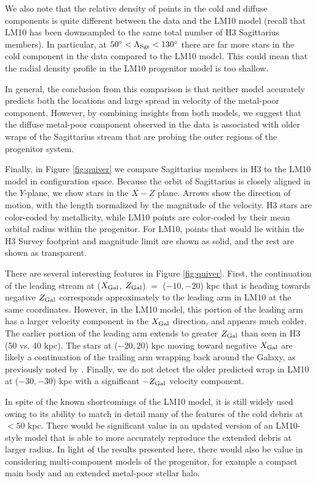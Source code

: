 \documentclass[twocolumn,tighten,twocolappendix]{aastex63}
\newcommand{\sgr}{Sagittarius}
\begin{document}
\begin{CJK*}{UTF8}{gbsn}
We also note that the relative density of points in the cold and diffuse components is quite different between the data and the LM10 model (recall that LM10 has been downsampled to the same total number of H3 \sgr{} members).  In particular, at $50^\circ<\Lambda_{\rm Sgr}<130^\circ$ there are far more stars in the cold component in the data compared to the LM10 model.  This could mean that the radial density profile in the LM10 progenitor model is too shallow.

In general, the conclusion from this comparison is that neither model accurately predicts both the locations and large spread in velocity of the metal-poor component.  However, by combining insights from both models, we suggest that the diffuse metal-poor component observed in the data is associated with older wraps of the \sgr{} stream that are probing the outer regions of the progenitor system.

Finally, in Figure \ref{fig:quiver} we compare \sgr{} members in H3 to the LM10 model in configuration space.  Because the orbit of \sgr{} is closely aligned in the $Y$-plane, we show stars in the $X-Z$ plane.  Arrows show the direction of motion, with the length normalized by the magnitude of the velocity.   H3 stars are color-coded by metallicity, while LM10 points are color-coded by their mean orbital radius within the progenitor.  For LM10, points that would lie within the H3 Survey footprint and magnitude limit are shown as solid, and the rest are shown as transparent.

There are several interesting features in Figure \ref{fig:quiver}.  First, the continuation of the leading stream at ($X_{\rm Gal}$, $Z_{\rm Gal}$) $=$ ($-10,-20$) kpc that is heading towards negative $Z_{\rm Gal}$ corresponds approximately to the leading arm in LM10 at the same coordinates.  However, in the LM10 model, this portion of the leading arm has a larger velocity component in the $X_{\rm Gal}$ direction, and appears much colder.  The earlier portion of the leading arm extends to greater $Z_{\rm Gal}$ than seen in H3 (50 vs. 40 kpc).  The stars at ($-20,20$) kpc moving toward negative $X_{\rm Gal}$ are likely a continuation of the trailing arm wrapping back around the Galaxy, as previously noted by \citet{Yang19}.  Finally, we do not detect the older predicted wrap in LM10 at ($-30,-30$) kpc with a significant $-Z_{\rm Gal}$ velocity component.

In spite of the known shortcomings of the LM10 model, it is still widely used owing to its ability to match in detail many of the features of the cold debris at $<50$ kpc.  There would be significant value in an updated version of an LM10-style model that is able to more accurately reproduce the extended debris at larger radius.  In light of the results presented here, there would also be value in considering multi-component models of the progenitor, for example a compact main body and an extended metal-poor stellar halo.


\end{CJK*}
\end{document}
